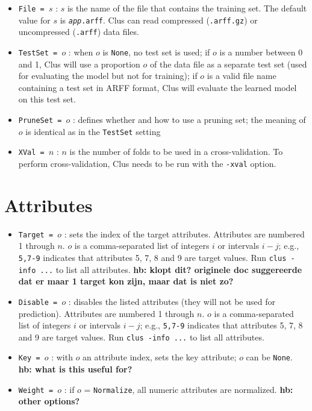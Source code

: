 \begin{itemize}
\item {\tt File = $s$} : $s$ is the name of the file that contains the training set.  The default value for $s$ is {\tt {\em app}.arff}.  Clus can read compressed ({\tt .arff.gz}) or uncompressed ({\tt .arff}) data files.
\item {\tt TestSet = $o$} : when $o$ is {\tt None}, no test set is used; if $o$ is a number between 0 and 1, Clus will use a proportion $o$ of the data file as a separate test set (used for evaluating the model but not for training); if $o$ is a valid file name containing a test set in ARFF format, Clus will evaluate the learned model on this test set.
\item {\tt PruneSet = $o$} : defines whether and how to use a pruning set; the meaning of $o$ is identical as in the {\tt TestSet} setting
\item {\tt XVal = $n$} : $n$ is the number of folds to be used in a cross-validation.  To perform cross-validation, Clus needs to be run with the {\tt -xval} option.
\end{itemize}

\section{Attributes}

\begin{itemize}
\item {\tt Target = $o$} : sets the index of the target attributes.  Attributes are numbered 1 through $n$.  $o$ is a comma-separated list of integers $i$ or intervals $i-j$; e.g., {\tt 5,7-9} indicates that attributes 5, 7, 8 and 9 are target values.  Run {\tt clus -info ...} to list all attributes.
{\bf * hb: klopt dit? originele doc suggereerde dat er maar 1 target kon zijn, maar dat is niet zo?}
\item {\tt Disable = $o$} : disables the listed attributes (they will not be used for prediction).  Attributes are numbered 1 through $n$.  $o$ is a comma-separated list of integers $i$ or intervals $i-j$; e.g., {\tt 5,7-9} indicates that attributes 5, 7, 8 and 9 are target values.  Run {\tt clus -info ...} to list all attributes.
\item {\tt Key = $o$} : with $o$ an attribute index, sets the key attribute; $o$ can be {\tt None}. 
   {\bf * hb: what is this useful for?}
\item {\tt Weight = $o$} : if $o$ = {\tt Normalize}, all numeric attributes are normalized.
   {\bf * hb: other options?}
\end{itemize}


